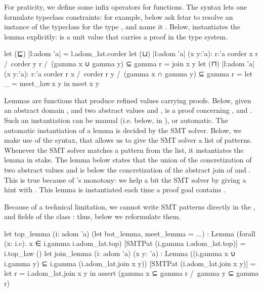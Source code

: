 \documentclass{llncs}
\begin{document}
For praticity, we define some infix operators for 
functions.
%
The syntax  lets one formulate typeclass
constraints: for example,  below ask \gls{fstar} to
resolve an instance of the typeclass  for the type
, and name it .
%
Below,  instantiates the lemma 
explicitly:  is a unit value that carries a
proof in the type system.
%
\begin{fstarcode}
let (⊑) {|l:adom 'a|} = l.adom_lat.corder
let (⊔) {|l:adom 'a|} (x y:'a): r:'a { corder x r /\ corder y r 
                                 /\ (gamma x ∪ gamma y) ⊆ gamma r } = join x y
let (⊓) {|l:adom 'a|} (x y:'a): r:'a { corder r x /\ corder r y
                                 /\ (gamma x ∩ gamma y) ⊆ gamma r }
  = let _ = meet_law x y in meet x y
\end{fstarcode}
%
Lemmas are functions that produce refined  values
carrying proofs.
%
Below, given an abstract domain , and two abstract values
 and ,  is a proof
concerning ,  and .
%
Such an instantiation can be manual (i.e. below,  in ), or automatic.
%
The automatic instantiation of a lemma is decided by the
SMT solver.
%
Below, we make use of the  syntax, that allows us to
give the SMT solver a list of patterns.
%
Whenever the SMT solver matches a pattern from the list, it
instantiates the lemma in stake.
%
The lemma  below states that the union of the
concretization of two abstract values  and  is
below the concretization of the abstract join of  and
.
%
This is true because of 's monotony: we help a bit
the SMT solver by giving a hint with .
%
This lemma is instantiated each time a proof goal contains
.

Because of a technical limitation, we cannot write SMT patterns
directly in the ,  and
 fields of the class : thus, below we
reformulate them.
%
\begin{fstarcode}
let top_lemma (i: adom 'a)      (let bot_lemma, meet_lemma = ...)
  : Lemma (forall (x: i.c). x ∈ i.gamma i.adom_lat.top)
          [SMTPat (i.gamma i.adom_lat.top)] = i.top_law ()
let join_lemma (i: adom 'a) (x y: 'a)
  : Lemma ((i.gamma x ∪ i.gamma y) ⊆ i.gamma (i.adom_lat.join x y))
          [SMTPat (i.adom_lat.join x y)]
  = let r = i.adom_lat.join x y in assert (gamma x ⊆ gamma r /\ gamma y ⊆ gamma r)
\end{fstarcode}
%
\end{document}
